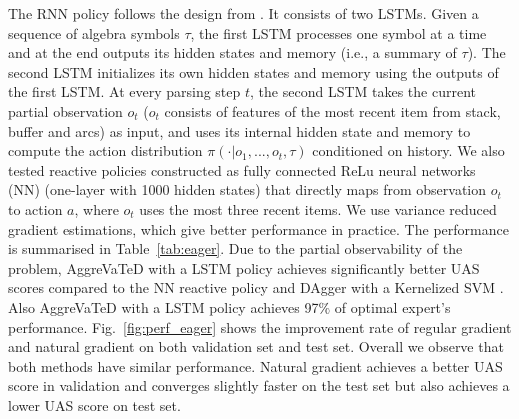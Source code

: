 \documentclass{article}
\begin{document}
The RNN policy follows the design from \cite{sutskever2014sequence}. It consists of two LSTMs. Given a sequence of algebra symbols $\tau$, the first LSTM processes one symbol at a time and at the end outputs its hidden states and memory (i.e., a summary of $\tau$). The second LSTM initializes its own hidden states and memory using the outputs of the first LSTM. At every parsing step $t$, the second LSTM takes the current partial observation $o_t$ ($o_t$ consists of features of the most recent item from stack, buffer and arcs) as input, and uses its internal hidden state and memory to compute the action distribution $\pi(\cdot|o_1,...,o_t,\tau)$ conditioned on history. We also tested reactive policies constructed as fully connected ReLu neural networks (NN) (one-layer with 1000 hidden states) that directly maps from observation $o_t$ to action $a$, where $o_t$ uses the most three recent items. We use variance reduced gradient estimations, which give better performance in practice. The performance is summarised in Table~\ref{tab:eager}. Due to the partial observability of the problem, AggreVaTeD with a LSTM policy achieves significantly better UAS scores compared to the NN reactive policy and DAgger with a Kernelized SVM \cite{duyckpredicting}. Also AggreVaTeD with a LSTM policy achieves 97$\%$ of optimal expert's performance. Fig.~\ref{fig:perf_eager} shows the improvement rate of regular gradient and natural gradient on both validation set and test set. Overall we observe that both methods have similar performance. Natural gradient achieves a better UAS score in validation and converges slightly faster on the test set but also achieves a lower UAS score on test set. 


\end{document}
